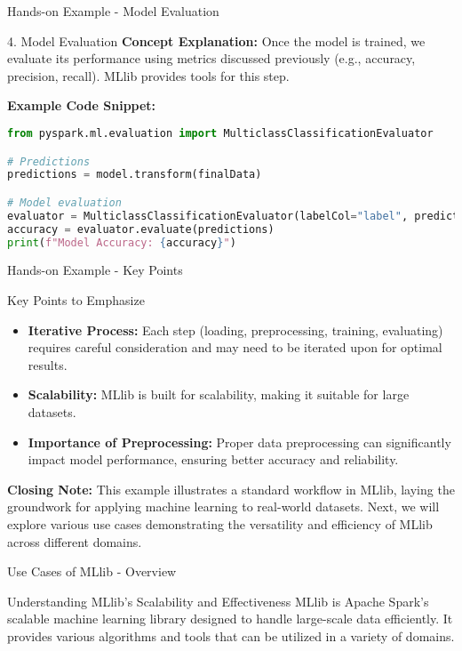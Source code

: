 \documentclass[aspectratio=169]{beamer}
\begin{document}
\begin{frame}[fragile]{Hands-on Example - Model Evaluation}
    \begin{block}{4. Model Evaluation}
        \textbf{Concept Explanation:}
        Once the model is trained, we evaluate its performance using metrics discussed previously (e.g., accuracy, precision, recall). MLlib provides tools for this step.
        
        \textbf{Example Code Snippet:}
    \end{block}
    
    \begin{lstlisting}[language=python]
from pyspark.ml.evaluation import MulticlassClassificationEvaluator

# Predictions
predictions = model.transform(finalData)

# Model evaluation
evaluator = MulticlassClassificationEvaluator(labelCol="label", predictionCol="prediction", metricName="accuracy")
accuracy = evaluator.evaluate(predictions)
print(f"Model Accuracy: {accuracy}")
    \end{lstlisting}
\end{frame}

\begin{frame}[fragile]{Hands-on Example - Key Points}
    \begin{block}{Key Points to Emphasize}
        \begin{itemize}
            \item \textbf{Iterative Process:} Each step (loading, preprocessing, training, evaluating) requires careful consideration and may need to be iterated upon for optimal results.
            \item \textbf{Scalability:} MLlib is built for scalability, making it suitable for large datasets.
            \item \textbf{Importance of Preprocessing:} Proper data preprocessing can significantly impact model performance, ensuring better accuracy and reliability.
        \end{itemize}
    \end{block}
    
    \textbf{Closing Note:} This example illustrates a standard workflow in MLlib, laying the groundwork for applying machine learning to real-world datasets. Next, we will explore various use cases demonstrating the versatility and efficiency of MLlib across different domains.
\end{frame}

\begin{frame}[fragile]{Use Cases of MLlib - Overview}
    \begin{block}{Understanding MLlib's Scalability and Effectiveness}
        MLlib is Apache Spark’s scalable machine learning library designed to handle large-scale data efficiently. It provides various algorithms and tools that can be utilized in a variety of domains.
    \end{block}
\end{frame}
\end{document}
